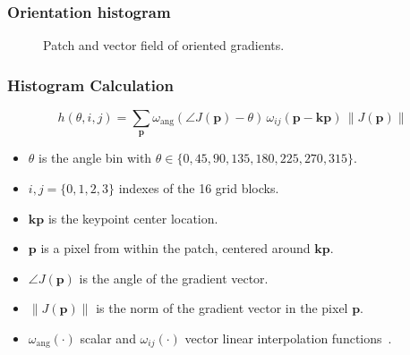 \documentclass[aspectratio=169]{beamer}
\begin{document}
\begin{frame}
\frametitle{Orientation histogram}
\begin{center}
\begin{figure}[h!]
\centering
\setlength\fboxsep{0pt}
\setlength\fboxrule{0.5pt}
\caption[Histogram of Gradient Orientations]{Patch and vector field of oriented gradients.}
\label{fig:sampledescriptor}
\end{figure}
\end{center}
\end{frame}

\begin{frame}
\frametitle{Histogram Calculation}
\begin{center}

\begin{equation}
 h(\theta,i,j) = \sum_{\mathbf{p}} \omega_\mathrm{ang}(\angle J(\mathbf{p}) - \theta)\, \omega_{ij}\left(\mathbf{p} - \mathbf{kp} \right)\, \left\lVert J(\mathbf{p})\right\rVert 
\label{eq:histogram}
\end{equation}

\begin{itemize}
\item $\theta$ is the angle bin with $ \theta \in \{0, 45, 90, 135, 180, 225, 270, 315\} $.
\item $ i,j = \{0,1,2,3\} $ indexes of the 16 grid blocks.
\item $\mathbf{kp}$ is the keypoint center location.
\item $\mathbf{p}$ is a pixel from within the patch, centered around $\mathbf{kp}$.
\item $\angle J(\mathbf{p}) $ is the angle of the gradient vector.
\item $ \left\lVert J(\mathbf{p}) \right\rVert $ is the norm of the gradient vector in the pixel $\mathbf{p}$.
\item $\omega_\mathrm{ang}(\cdot) $ scalar and $ \omega_{ij}(\cdot) $ vector linear interpolation functions~.
\end{itemize}

\end{center}
\end{frame}
\end{document}
